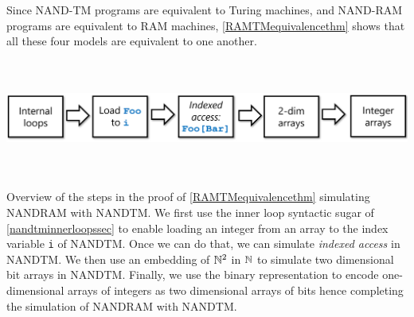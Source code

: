 Since NAND-TM programs are equivalent to Turing machines, and NAND-RAM
programs are equivalent to RAM machines, \cref{RAMTMequivalencethm}
shows that all these four models are equivalent to one another.


\begin{marginfigure}
\centering
\includegraphics[width=\linewidth, height=1.5in, keepaspectratio]{../figure/nandramproofoverview.png}
\caption{Overview of the steps in the proof of
\cref{RAMTMequivalencethm} simulating NANDRAM with NANDTM. We first use
the inner loop syntactic sugar of \cref{nandtminnerloopssec} to enable
loading an integer from an array to the index variable \texttt{i} of
NANDTM. Once we can do that, we can simulate \emph{indexed access} in
NANDTM. We then use an embedding of \({\mathbb{N}}^2\) in \({\mathbb{N}}\) to simulate two
dimensional bit arrays in NANDTM. Finally, we use the binary
representation to encode one-dimensional arrays of integers as two
dimensional arrays of bits hence completing the simulation of NANDRAM
with NANDTM.}
\label{nandramoverviewfig}
\end{marginfigure}

